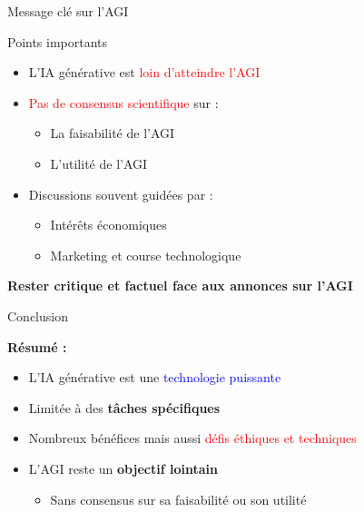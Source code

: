 \begin{frame}{Message clé sur l'AGI}

\begin{block}{Points importants}
\begin{itemize}
    \item L'IA générative est \textcolor{red}{loin d'atteindre l'AGI}
    \item \textcolor{red}{Pas de consensus scientifique} sur :
        \begin{itemize}
            \item La faisabilité de l'AGI
            \item L'utilité de l'AGI
        \end{itemize}
    \item Discussions souvent guidées par :
        \begin{itemize}
            \item Intérêts économiques
            \item Marketing et course technologique
        \end{itemize}
\end{itemize}
\end{block}

\vspace{0.3cm}

\textbf{Rester critique et factuel face aux annonces sur l'AGI}

\end{frame}

\begin{frame}{Conclusion}

\textbf{Résumé :}

\vspace{0.3cm}

\begin{itemize}
    \item L'IA générative est une \textcolor{blue}{technologie puissante}
    \item Limitée à des \textbf{tâches spécifiques}
    \item Nombreux bénéfices mais aussi \textcolor{red}{défis éthiques et techniques}
    \item L'AGI reste un \textbf{objectif lointain}
        \begin{itemize}
            \item Sans consensus sur sa faisabilité ou son utilité
        \end{itemize}
\end{itemize}

\end{frame}

